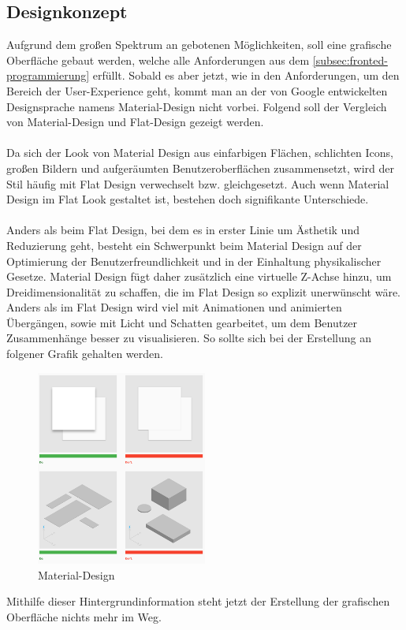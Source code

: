 \subsection{Designkonzept}
Aufgrund dem großen Spektrum an gebotenen Möglichkeiten, soll eine grafische Oberfläche gebaut werden, welche alle Anforderungen aus dem \autoref{subsec:fronted-programmierung} erfüllt.
Sobald es aber jetzt, wie in den Anforderungen, um den Bereich der User-Experience geht, kommt man an der von Google entwickelten Designsprache namens Material-Design nicht vorbei.
Folgend soll der Vergleich von Material-Design und Flat-Design gezeigt werden.\\\\
Da sich der Look von Material Design aus einfarbigen Flächen, schlichten Icons, großen Bildern und aufgeräumten Benutzeroberflächen zusammensetzt, wird der Stil häufig mit Flat Design verwechselt bzw. gleichgesetzt. Auch wenn Material Design im Flat Look gestaltet ist, bestehen doch signifikante Unterschiede.\\\\
Anders als beim Flat Design, bei dem es in erster Linie um Ästhetik und Reduzierung geht, besteht ein Schwerpunkt beim Material Design auf der Optimierung der Benutzerfreundlichkeit und in der Einhaltung physikalischer Gesetze.
Material Design fügt daher zusätzlich eine virtuelle Z-Achse hinzu, um Dreidimensionalität zu schaffen, die im Flat Design so explizit unerwünscht wäre.
Anders als im Flat Design wird viel mit Animationen und animierten Übergängen, sowie mit Licht und Schatten gearbeitet, um dem Benutzer Zusammenhänge besser zu visualisieren.
So sollte sich bei der Erstellung an folgener Grafik gehalten werden.
\begin{figure}[H]
\centering
\includegraphics[width=0.5\textwidth]{fig/ainf/material-design-rules.png}
\caption{Material-Design}
\label{rpiAndDisplay}
\end{figure}
Mithilfe dieser Hintergrundinformation steht jetzt der Erstellung der grafischen Oberfläche nichts mehr im Weg.
